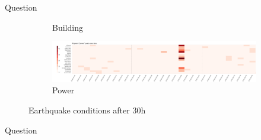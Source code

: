 \documentclass{article}
\begin{document}
\begin{section}{Question}
\begin{figure}[!h]
\begin{subfigure}[!h]{0.48\textwidth}
        \caption{Building}
    \end{subfigure}
    \begin{subfigure}[!h]{0.48\textwidth}
        \centering
        \includegraphics[width=1.00\textwidth]{figs/cond_30h/cond_30h_power.png}
        \caption{Power}
    \end{subfigure}
    \caption{Earthquake conditions after 30h}
    \label{fig:eq_cond_30h}
\end{figure}

\end{section}

\begin{section}{Question}
\end{section}
\end{document}
